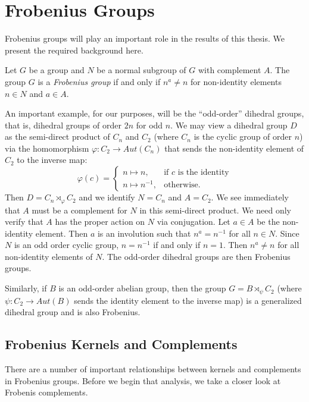 \documentclass[main.tex]{subfiles}
\begin{document}
\section{Frobenius Groups}

Frobenius groups will play an important role in the results of this thesis. We present the required background here.

\hss

\begin{definition}
Let $G$ be a group and $N$ be a normal subgroup of $G$ with complement $A$. The group $G$ is a \emph{Frobenius group} if and only if $n^a \ne n$ for non-identity elements $n \in N$ and $a \in A$.
\end{definition}

\hss

An important example, for our purposes, will be the ``odd-order'' dihedral groups, that is, dihedral groups of order $2n$ for odd $n$. We may view a dihedral group $D$ as the semi-direct product of $C_n$ and $C_2$ (where $C_n$ is the cyclic group of order $n$) via the homomorphism $\varphi: C_2 \to Aut(C_n)$ that sends the non-identity element of $C_2$ to the inverse map:
\[
    \varphi(c)=
    \begin{cases}
        n \mapsto n, & \text{if $c$ is the identity} \\
        n \mapsto n^{-1}, & \text{otherwise.}
    \end{cases}
\]
Then $D = C_n \rtimes_{\varphi} C_2$ and we identify $N = C_n$ and $A = C_2$. We see immediately that $A$ must be a complement for $N$ in this semi-direct product. We need only verify that $A$ has the proper action on $N$ via conjugation. Let $a \in A$ be the non-identity element. Then $a$ is an involution such that $n^a = n^{-1}$ for all $n \in N$. Since $N$ is an odd order cyclic group, $n = n^{-1}$ if and only if $n = 1$. Then $n^a \ne n$ for all non-identity elements of $N$. The odd-order dihedral groups are then Frobenius groups.

Similarly, if $B$ is an odd-order abelian group, then the group $G = B \rtimes_\psi C_2$ (where $\psi: C_2 \to Aut(B)$ sends the identity element to the inverse map) is a generalized dihedral group and is also Frobenius.

\subsection{Frobenius Kernels and Complements}

There are a number of important relationships between kernels and complements in Frobenius groups. Before we begin that analysis, we take a closer look at Frobenis complements.
\end{document}
